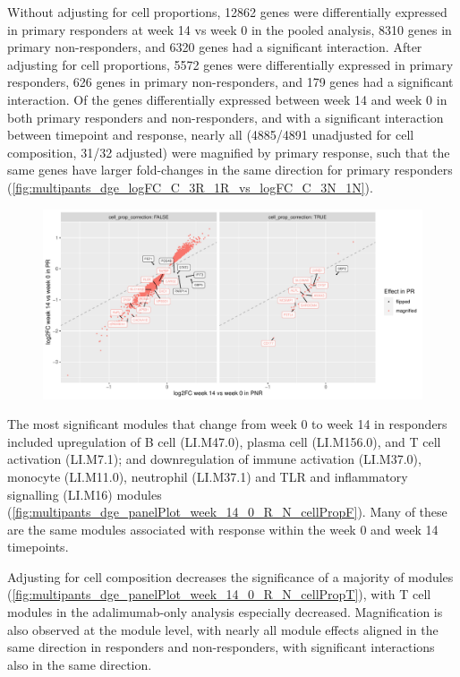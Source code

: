 \begin{outline}
Without adjusting for cell proportions,
12862 genes were differentially expressed in primary responders at week 14 vs week 0 in the pooled analysis,
8310 genes in primary non-responders,
and 6320 genes had a significant interaction.
After adjusting for cell proportions, 
5572 genes were differentially expressed in primary responders,
626 genes in primary non-responders,
and 179 genes had a significant interaction.
Of the genes differentially expressed between week 14 and week 0 in both primary responders and non-responders,
and with a significant interaction between timepoint and response, 
nearly all (4885/4891 unadjusted for cell composition, 31/32 adjusted) were magnified by primary response,
such that the same genes have larger fold-changes in the same direction for primary responders (\autoref{fig:multipants_dge_logFC_C_3R_1R_vs_logFC_C_3N_1N}).

\begin{figure}
    \centering
    \includegraphics[width=1.0\textwidth,page=1]{mainmatter/figures/chapter_04/plot_gene_set_enrichment.logFC_C_3R_1R_vs_logFC_C_3N_1N.pdf}
    \caption{}
    \label{fig:multipants_dge_logFC_C_3R_1R_vs_logFC_C_3N_1N}
\end{figure}

The most significant modules that change from week 0 to week 14 in responders included
upregulation of B cell (LI.M47.0), plasma cell (LI.M156.0), and T cell activation (LI.M7.1);
and downregulation of immune activation (LI.M37.0), monocyte (LI.M11.0), neutrophil (LI.M37.1) and TLR and inflammatory signalling (LI.M16) modules (\autoref{fig:multipants_dge_panelPlot_week_14_0_R_N_cellPropF}).
Many of these are the same modules associated with response within the week 0 and week 14 timepoints.

Adjusting for cell composition decreases the significance of a majority of modules (\autoref{fig:multipants_dge_panelPlot_week_14_0_R_N_cellPropT}),
with T cell modules in the adalimumab-only analysis especially decreased.
Magnification is also observed at the module level, with nearly all module effects aligned in the same direction in responders and non-responders, with significant interactions also in the same direction.


\end{outline}
